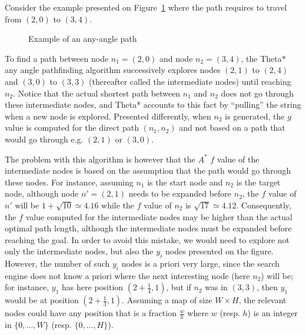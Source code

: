 Consider the example presented on Figure~\ref{fig::ex1} 
where the path requires to travel from $(2,0)$ to $(3,4)$.  


\begin{figure}[ht]
  \begin{center}
    
  \end{center}
  \caption{Example of an any-angle path}
  \label{fig::ex1}
\end{figure}

To find a path between node $n_1 = (2,0)$ and node $n_2 = (3,4)$, 
the Theta$*$ any angle pathfinding algorithm \cite{nash10}
successively explores nodes $(2,1)$ to $(2,4)$ and $(3,0)$ to $(3,3)$ 
(thereafter called the intermediate nodes) until reaching $n_2$.  
Notice that the actual shortest path between $n_1$ and $n_2$ 
does not go through these intermediate nodes, 
and Theta* accounts to this fact by ``pulling'' the string 
when a new node is explored.  
Presented differently, when $n_2$ is generated, 
the $g$ value is computed for the direct path $(n_1,n_2)$ 
and not based on a path that would go through e.g. $(2,1)$ or $(3,0)$.  

The problem with this algorithm 
is however that the $A^*$ $f$ value of the intermediate nodes 
is based on the assumption that the path would go through these nodes.  
For instance, assuming $n_1$ is the start node 
and $n_2$ is the target node, 
although node $n' = (2,1)$ needs to be expanded before $n_2$, 
the $f$ value of $n'$ will be $1 + \sqrt{10} \simeq 4.16$ 
while the $f$ value of $n_2$ is $\sqrt{17} \simeq 4.12$.  
Consequently, the $f$ value computed 
for the intermediate nodes may be higher 
than the actual optimal path length, 
although the intermediate nodes must be expanded 
before reaching the goal.  
In order to avoid this mistake, 
we would need to explore not only the intermediate nodes, 
but also the $y_i$ nodes presented on the figure.  
However, the number of such $y_i$ nodes is a priori very large, 
since the search engine does not know a priori 
where the next interesting node (here $n_2$) will be; 
for instance, $y_1$ has here position $(2 + \frac{1}{4},1)$, 
but if $n_2$ was in $(3,3)$, 
then $y_1$ would be at position $(2 + \frac{1}{3},1)$.  
Assuming a map of size $W\times H$, 
the relevant nodes could have any position 
that is a fraction $\frac{w}{h}$ 
where $w$ (resp. $h$) is an integer 
in $\{0,\dots,W\}$ (resp. $\{0,\dots,H\}$).  

